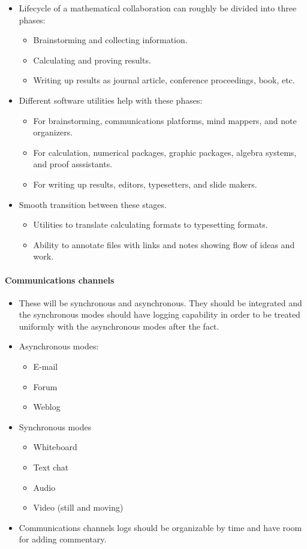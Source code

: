 \begin{itemize}
\item
  Lifecycle of a mathematical collaboration can roughly be divided into
  three phases: 
  \begin{itemize}
  \item Brainstorming and collecting information.
  \item Calculating and proving results.
  \item Writing up results as journal
  article, conference proceedings, book, etc.
  \end{itemize}
\item
  Different software utilities help with these phases: 
  \begin{itemize}
  \item For brainstorming, communications platforms, mind mappers, and note
  organizers. 
  \item For calculation, numerical packages, graphic packages,
  algebra systems, and proof asssistants. 
  \item For writing up results,
  editors, typesetters, and slide makers.
  \end{itemize}
\item
  Smooth transition between these stages. 
  \begin{itemize}
  \item Utilities to translate
  calculating formats to typesetting formats. 
  \item Ability to annotate
  files with links and notes showing flow of ideas and work.
  \end{itemize}
\end{itemize}

\paragraph{Communications channels}

\begin{itemize}
\item
  These will be synchronous and asynchronous. They should be integrated
  and the synchronous modes should have logging capability in order to
  be treated uniformly with the asynchronous modes after the fact. 
  \item Asynchronous modes: 
  \begin {itemize} 
  \item E-mail 
  \item Forum 
  \item Weblog
  \end{itemize}
  \item Synchronous modes 
  \begin{itemize}
  \item Whiteboard 
  \item Text chat 
  \item Audio 
  \item Video (still and moving)
  \end{itemize}
\item
  Communications channels logs should be organizable by time and have
  room for adding commentary.
\end{itemize}

